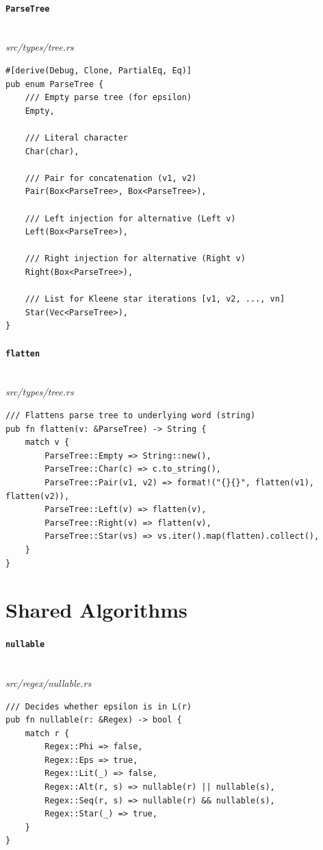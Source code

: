 \paragraph{\texttt{ParseTree}}\ \\[-0.4em]
\textit{\small src/types/tree.rs}
{\scriptsize\begin{verbatim}
#[derive(Debug, Clone, PartialEq, Eq)]
pub enum ParseTree {
    /// Empty parse tree (for epsilon)
    Empty,

    /// Literal character
    Char(char),

    /// Pair for concatenation (v1, v2)
    Pair(Box<ParseTree>, Box<ParseTree>),

    /// Left injection for alternative (Left v)
    Left(Box<ParseTree>),

    /// Right injection for alternative (Right v)
    Right(Box<ParseTree>),

    /// List for Kleene star iterations [v1, v2, ..., vn]
    Star(Vec<ParseTree>),
}
\end{verbatim}}

\paragraph{\texttt{flatten}}\ \\[-0.4em]
\textit{\small src/types/tree.rs}
{\scriptsize\begin{verbatim}
/// Flattens parse tree to underlying word (string)
pub fn flatten(v: &ParseTree) -> String {
    match v {
        ParseTree::Empty => String::new(),
        ParseTree::Char(c) => c.to_string(),
        ParseTree::Pair(v1, v2) => format!("{}{}", flatten(v1), flatten(v2)),
        ParseTree::Left(v) => flatten(v),
        ParseTree::Right(v) => flatten(v),
        ParseTree::Star(vs) => vs.iter().map(flatten).collect(),
    }
}
\end{verbatim}}

\section{Shared Algorithms}
\label{app:code-shared}

\paragraph{\texttt{nullable}}\ \\[-0.4em]
\textit{\small src/regex/nullable.rs}
{\scriptsize\begin{verbatim}
/// Decides whether epsilon is in L(r)
pub fn nullable(r: &Regex) -> bool {
    match r {
        Regex::Phi => false,
        Regex::Eps => true,
        Regex::Lit(_) => false,
        Regex::Alt(r, s) => nullable(r) || nullable(s),
        Regex::Seq(r, s) => nullable(r) && nullable(s),
        Regex::Star(_) => true,
    }
}
\end{verbatim}}

